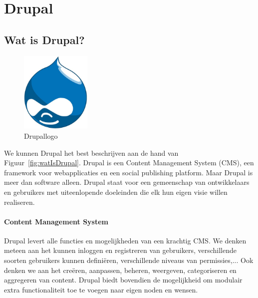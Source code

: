 \chapter{Drupal} \label{Drupal}

\section{Wat is Drupal?}

\begin{figure}
\vspace{-40pt}
\centering
\label{fig:drupalLogo}
\includegraphics[width=0.3\textwidth]{fig/drupalLogo}
\vspace{-30pt}
\centering
\caption{Drupallogo}
\centering
\vspace{-40pt}
\end{figure}
We kunnen Drupal het best beschrijven aan de hand van Figuur~\ref{fig:watIsDrupal}.
Drupal is een Content Management System (CMS), een framework voor webapplicaties en een social publishing platform. Maar Drupal is meer dan software alleen. Drupal staat voor een gemeenschap van ontwikkelaars en gebruikers met uiteenlopende doeleinden die elk hun eigen visie willen realiseren. \cite{drupalDefGuide}

\subsubsection{Content Management System}

Drupal levert alle functies en mogelijkheden van een krachtig CMS. We denken meteen aan het kunnen inloggen en registreren van gebruikers, verschillende soorten gebruikers kunnen defini\"{e}ren, verschillende niveaus van permissies,... Ook denken we aan het cre\"{e}ren, aanpassen, beheren, weergeven, categoriseren en aggregeren van content. Drupal biedt bovendien de mogelijkheid om modulair extra functionaliteit toe te voegen naar eigen noden en wensen.

